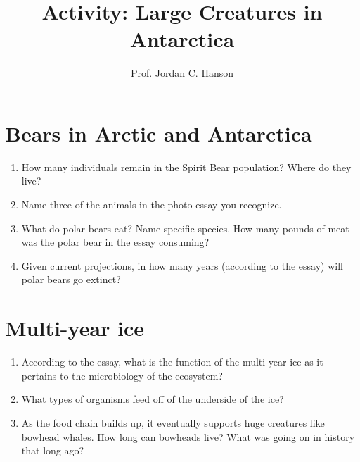 \documentclass{article}
\begin{document}
\title{Activity: Large Creatures in Antarctica}
\author{Prof. Jordan C. Hanson}

\maketitle

\section{Bears in Arctic and Antarctica}

\begin{enumerate}
\item How many individuals remain in the Spirit Bear population?  Where do they live? \\ \vspace{1cm}
\item Name three of the animals in the photo essay you recognize. \\ \vspace{1cm}
\item What do polar bears eat?  Name specific species.  How many pounds of meat was the polar bear in the essay consuming?  \\ \vspace{2cm}
\item Given current projections, in how many years (according to the essay) will polar bears go extinct? \\ \vspace{1cm}
\end{enumerate}

\section{Multi-year ice}

\begin{enumerate}
\item According to the essay, what is the function of the multi-year ice as it pertains to the microbiology of the ecosystem? \\ \vspace{2cm}
\item What types of organisms feed off of the underside of the ice? \\ \vspace{1cm}
\item As the food chain builds up, it eventually supports huge creatures like bowhead whales.  How long can bowheads live?  What was going on in history that long ago? \\ \vspace{2cm}
\end{enumerate}
\end{document}
